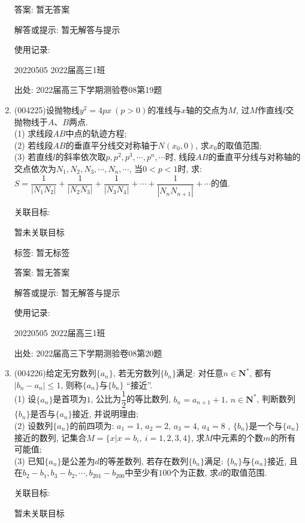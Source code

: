 \documentclass[10pt,a4paper]{article}
\begin{document}
\begin{enumerate}[1.]
答案: 暂无答案

解答或提示: 暂无解答与提示

使用记录:

20220505	2022届高三1班		


出处: 2022届高三下学期测验卷08第19题
\item { (004225)}设抛物线$y^2=4px\ (p>0)$的准线与$x$轴的交点为$M$, 过$M$作直线$l$交抛物线于$A$、$B$两点.\\
(1) 求线段$AB$中点的轨迹方程;\\
(2) 若线段$AB$的垂直平分线交对称轴于$N(x_0,0)$, 求$x_0$的取值范围;\\
(3) 若直线$l$的斜率依次取$p, p^2,p^3,\cdots ,p^n,\cdots$时, 线段$AB$的垂直平分线与对称轴的交点依次为$N_1, N_2, N_3,\cdots ,N_n, \cdots$, 当$0<p<1$时, 求: $S=\dfrac 1{|N_1N_2|}+\dfrac 1{|N_2N_3|}+\dfrac 1{|N_3N_4|}+\cdots +\dfrac 1{|N_nN_{n+1}|}+\cdots$的值.


关联目标:

暂未关联目标



标签: 暂无标签

答案: 暂无答案

解答或提示: 暂无解答与提示

使用记录:

20220505	2022届高三1班			


出处: 2022届高三下学期测验卷08第20题
\item { (004226)}给定无穷数列$\{a_n\}$, 若无穷数列$\{b_n\}$满足: 对任意$n\in \mathbf{N}^*$, 都有$|b_n-a_n|\le 1$, 则称$\{a_n\}$与$\{b_n\}$ ``接近''.\\
(1) 设$\{a_n\}$是首项为$1$, 公比为$\dfrac 12$的等比数列, $b_n=a_{n+1}+1$, $n\in \mathbf{N}^*$, 判断数列$\{b_n\}$是否与$\{a_n\}$接近, 并说明理由;\\
(2) 设数列$\{a_n\}$的前四项为: $a_1=1$, $a_2=2$, $a_3=4$, $a_4=8$ , $\{b_n\}$是一个与$\{a_n\}$接近的数列, 记集合$M=\{x|x=b_i,\ i=1,2,3,4\}$, 求$M$中元素的个数$m$的所有可能值;\\
(3) 已知$\{a_n\}$是公差为$d$的等差数列, 若存在数列$\{b_n\}$满足: $\{b_n\}$与$\{a_n\}$接近, 且在$b_2-b_1,b_3-b_2,\cdots,b_{201}-b_{200}$中至少有$100$个为正数, 求$d$的取值范围.


关联目标:

暂未关联目标




\end{enumerate}
\end{document}
